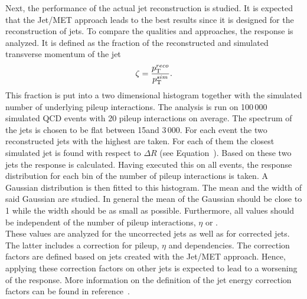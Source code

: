 Next, the performance of the actual jet reconstruction is studied. It is expected that the Jet/MET approach leads to the best results since it is designed for the reconstruction of jets. To compare the qualities and approaches, the \pt{} response is analyzed. It is defined as the fraction of the reconstructed and simulated transverse momentum of the jet
\begin{equation}
\zeta = \frac{p_{\mathrm{T}}^{reco}}{p_{\mathrm{T}}^{sim}}.
\label{eq:OOPtResponse}
\end{equation}
This fraction is put into a two dimensional histogram together with the simulated number of underlying pileup interactions. The analysis is run on 100\,000 simulated QCD events with 20 pileup interactions on average. The spectrum of the jets \pt is chosen to be flat between 15\GeV and 3\,000\GeV{}. For each event the two reconstructed jets with the highest \pt are taken. For each of them the closest simulated jet is found with respect to $\Delta{}R$ (see Equation~). Based on these two jets the \pt{} response is calculated. Having executed this on all events, the \pt{} response distribution for each bin of the number of pileup interactions is taken. A Gaussian distribution is then fitted to this histogram. The mean and the width of said Gaussian are studied. In general the mean of the Gaussian should be close to 1 while the width should be as small as possible. Furthermore, all values should be independent of the number of pileup interactions, $\eta$ or \pt{}. \\
These values are analyzed for the uncorrected jets as well as for corrected jets. The latter includes a correction for pileup, $\eta$ and \pt dependencies. The correction factors are defined based on jets created with the Jet/MET approach. Hence, applying these correction factors on other jets is expected to lead to a worsening of the \pt{} response. More information on the definition of the jet energy correction factors can be found in reference~.


